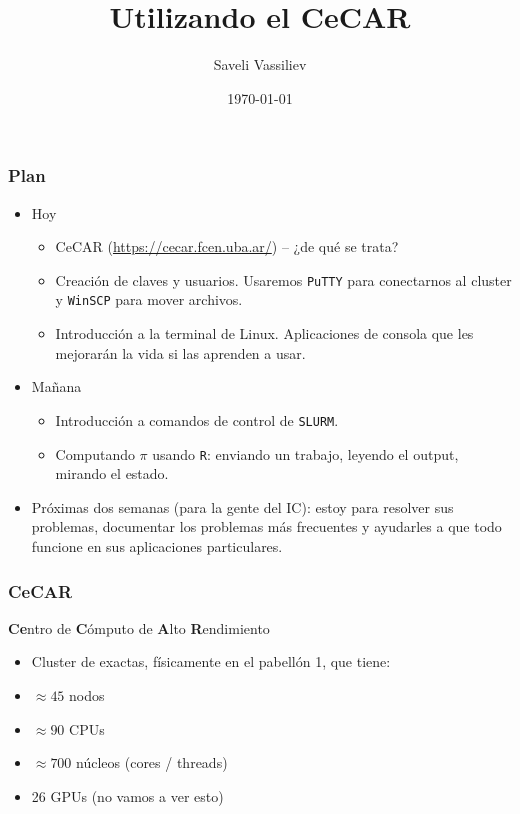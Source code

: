 \documentclass[]{beamer}
\title[CeCAR]{Utilizando el CeCAR}
\author[Saveli Vassiliev]{Saveli Vassiliev}
\institute[UBA, FCEyN, IC]{Universidad de Buenos Aires \\ Facultad de Ciencias Exactas y Naturales, Instituto de Cálculo}
\date{\today}                    %
\begin{document}
\begin{frame}
  \titlepage
\end{frame}

%


\begin{frame}
\frametitle{Plan}
\begin{itemize}
  \item<+-> Hoy
  \begin{itemize}
    \item CeCAR (\url{https://cecar.fcen.uba.ar/}) -- ¿de qué se trata?
    \item Creación de claves y usuarios. Usaremos \Verb=PuTTY= para conectarnos al cluster y \Verb=WinSCP= para mover archivos.
    \item Introducción a la terminal de Linux. Aplicaciones de consola que les mejorarán la vida si las aprenden a usar.
  \end{itemize}
  \item<+-> Mañana
  \begin{itemize}
    \item Introducción a comandos de control de \Verb=SLURM=.
    \item Computando $\pi$ usando \Verb=R=: enviando un trabajo, leyendo el output, mirando el estado.
  \end{itemize}
  \item<+-> Próximas dos semanas (para la gente del IC): estoy para resolver sus problemas, documentar los problemas más frecuentes y ayudarles a que todo funcione en sus aplicaciones particulares.
\end{itemize}
\end{frame}

\begin{frame}
\frametitle{CeCAR}
\textbf{Ce}ntro de \textbf{C}ómputo de \textbf{A}lto \textbf{R}endimiento

\begin{itemize}
  \item Cluster de exactas, físicamente en el pabellón 1, que tiene:
  \item $\approx 45$ nodos
  \item $\approx 90$ CPUs
  \item $\approx 700$ núcleos (cores / threads)
  \item 26 GPUs (no vamos a ver esto)
\end{itemize}
\end{frame}
\end{document}

